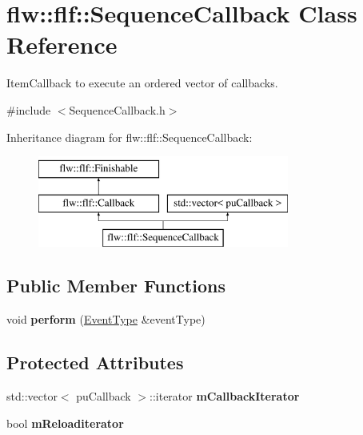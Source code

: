 \hypertarget{classflw_1_1flf_1_1SequenceCallback}{}\section{flw\+:\+:flf\+:\+:Sequence\+Callback Class Reference}
\label{classflw_1_1flf_1_1SequenceCallback}


Item\+Callback to execute an ordered vector of callbacks.  




{\ttfamily \#include $<$Sequence\+Callback.\+h$>$}

Inheritance diagram for flw\+:\+:flf\+:\+:Sequence\+Callback\+:\begin{figure}[H]
\begin{center}
\leavevmode
\includegraphics[height=3.000000cm]{classflw_1_1flf_1_1SequenceCallback}
\end{center}
\end{figure}
\subsection*{Public Member Functions}
\begin{DoxyCompactItemize}
\item 
void {\bfseries perform} (\hyperlink{classflw_1_1flf_1_1EventType}{Event\+Type} \&event\+Type)\hypertarget{classflw_1_1flf_1_1SequenceCallback_ac3ec71a6fe80f9b4f06b67eea85ad2df}{}\label{classflw_1_1flf_1_1SequenceCallback_ac3ec71a6fe80f9b4f06b67eea85ad2df}

\end{DoxyCompactItemize}
\subsection*{Protected Attributes}
\begin{DoxyCompactItemize}
\item 
std\+::vector$<$ pu\+Callback $>$\+::iterator {\bfseries m\+Callback\+Iterator}\hypertarget{classflw_1_1flf_1_1SequenceCallback_a687109ca4d396f12a2857ea687be2a2c}{}\label{classflw_1_1flf_1_1SequenceCallback_a687109ca4d396f12a2857ea687be2a2c}

\item 
bool {\bfseries m\+Reloaditerator}\hypertarget{classflw_1_1flf_1_1SequenceCallback_a6b752cb19766076ef4b1a6bdc6dd5464}{}\label{classflw_1_1flf_1_1SequenceCallback_a6b752cb19766076ef4b1a6bdc6dd5464}

\end{DoxyCompactItemize}
